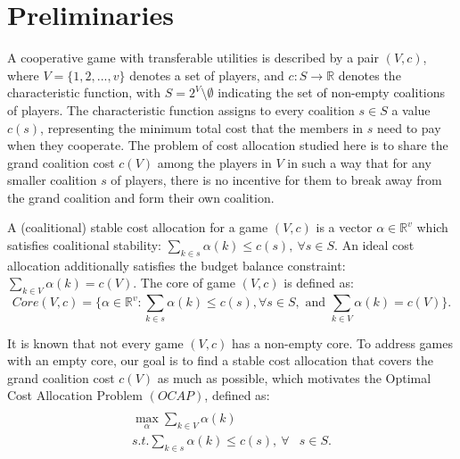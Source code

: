 \documentclass[ijoc,nonblindrev]{informs3} %
\newcommand{\R}{\mathbb{R}}
\begin{document}
\section{Preliminaries}\label{sec:definition}
A cooperative game with transferable utilities is described by a pair $(V,c)$, where $V = \{1,2,...,v\}$ denotes a set of players, and $c:S \rightarrow \mathbb{R}$ denotes the characteristic function, with $S= 2^V \setminus \emptyset$ indicating the set of non-empty coalitions of players.
The characteristic function assigns to every coalition $s\in S$ a value $c(s)$, representing the minimum total cost that the members in $s$ need to pay when they cooperate. 
The problem of cost allocation studied here is to share the grand coalition cost $c(V)$ among the players in $V$ in such a way that for any smaller coalition $s$ of players, there is no incentive for them to break away from the grand coalition and form their own coalition.


A (coalitional) stable cost allocation for a  game $(V,c)$ is a vector $\alpha \in \R^{v}$ which satisfies coalitional stability:
$\sum_{k \in s} \alpha(k) \leq c(s),~ \forall s \in S$.
An ideal cost allocation additionally satisfies the budget balance constraint:
$\sum_{k \in V} \alpha(k) = c( V)$.
The core of  game $(V,c)$ is defined as:
\begin {equation*} \label{eqn:budgetbalance}
Core(V,c)=\{\alpha \in \R^{v}:\sum_{k \in s} \alpha(k) \leq c(s),\forall s \in S, \mbox{ and } \sum_{k \in V} \alpha(k) = c( V)\}.
\end {equation*}


It is known that not every game $(V,c)$  has a non-empty core. To address games with an empty core, our goal is to find a stable cost allocation that covers the grand coalition cost $c(V)$ as much as possible, which motivates the Optimal Cost Allocation Problem $(OCAP)$, defined as:
\begin{eqnarray}\label{eqn:OCAP}
\begin{aligned}
\begin{split}
\max_{\alpha} \sum_{k \in V} \alpha(k)&\\
s.t. \sum_{k \in s} \alpha(k) \leq  c(s),~ \forall &s \in S.
\end{split}
\end{aligned}
\end{eqnarray}
\end{document}
